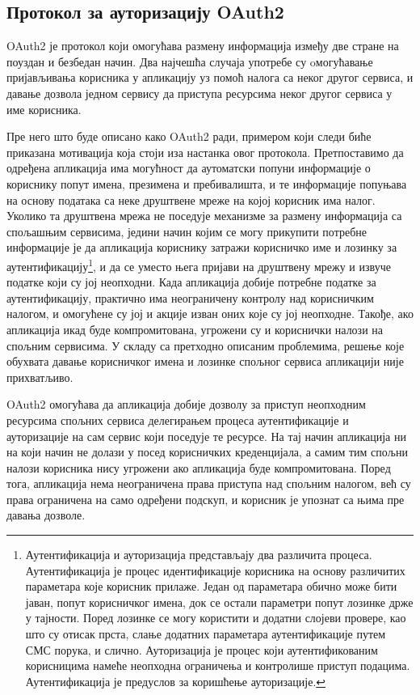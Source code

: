 \documentclass[12pt,oneside]{memoir}
\begin{document}
\subsection{Протокол за ауторизацију OAuth2}
OAuth2 је протокол који омогућава размену информација између две стране на поуздан и безбедан начин. Два најчешћа случаја употребе су oмогућавање пријављивања корисника у апликацију уз помоћ налога са неког другог сервиса, и давање дозвола једном сервису да приступа ресурсима неког другог сервиса у име корисника.

Пре него што буде описано како OAuth2 ради, примером који следи биће приказана мотивација која стоји иза настанка овог протокола. Претпоставимо да одређена апликација има могућност да аутоматски попуни информације о кориснику попут имена, презимена и пребивалишта, и те информације попуњава на основу података са неке друштвене мреже на којој корисник има налог. Уколико та друштвена мрежа не поседује механизме за размену информација са спољашњим сервисима, једини начин којим се могу прикупити потребне информације је да апликација кориснику затражи корисничко име и лозинку за аутентификацију\footnote{Аутентификација и ауторизација представљају два различита процеса. Аутентификација је процес идентификације корисника на основу различитих параметара које корисник прилаже. Један од параметара обично може бити јаван, попут корисничког имена, док се остали параметри попут лозинке држе у тајности. Поред лозинке се могу користити и додатни слојеви провере, као што су отисак прста, слање додатних параметара аутентификације путем СМС порука, и слично. Ауторизација је процес који аутентификованим корисницима намеће неопходна ограничења и контролише приступ подацима. Аутентификација је предуслов за коришћење ауторизације.}, и да се уместо њега пријави на друштвену мрежу и извуче податке који су јој неопходни. Када апликација добије потребне податке за аутентификацију, практично има неограничену контролу над корисничким налогом, и омогућене су јој и акције изван оних које су јој неопходне. Такође, ако апликација икад буде компромитована, угрожени су и кориснички налози на спољним сервисима. У складу са претходно описаним проблемима, решење које обухвата давање корисничког имена и лозинке спољног сервиса апликацији није прихватљиво.

OAuth2 омогућава да апликација добије дозволу за приступ неопходним ресурсима спољних сервиса делегирањем процеса аутентификације и ауторизације на сам сервис који поседује те ресурсе. На тај начин апликација ни на који начин не долази у посед корисничких креденцијала, а самим тим спољни налози корисника нису угрожени ако апликација буде компромитована. Поред тога, апликација нема неограничена права приступа над спољним налогом, већ су права ограничена на само одређени подскуп, и корисник је упознат са њима пре давања дозволе.
\end{document}
